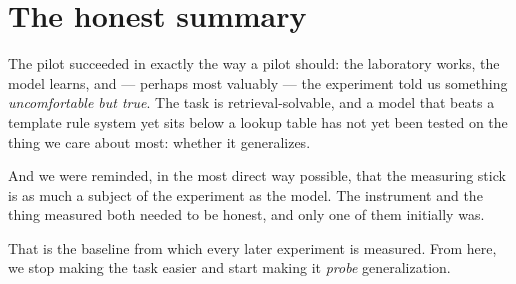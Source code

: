 \section{The honest summary}\label{the-honest-summary}

The pilot succeeded in exactly the way a pilot should: the laboratory
works, the model learns, and --- perhaps most valuably --- the
experiment told us something \emph{uncomfortable but true}. The task is
retrieval-solvable, and a model that beats a template rule system yet
sits below a lookup table has not yet been tested on the thing we care
about most: whether it generalizes.

And we were reminded, in the most direct way possible, that the
measuring stick is as much a subject of the experiment as the model. The
instrument and the thing measured both needed to be honest, and only one
of them initially was.

That is the baseline from which every later experiment is measured. From
here, we stop making the task easier and start making it \emph{probe}
generalization.

